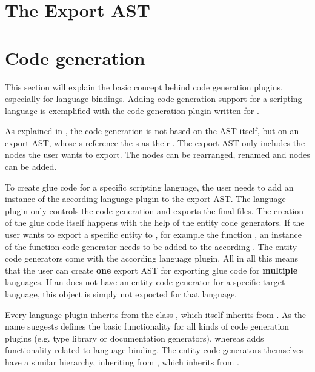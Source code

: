 \section{The Export AST}

\section{Code generation}

This section will explain the basic concept behind code generation plugins, especially for language bindings. Adding code generation support for a scripting language is exemplified with the code generation plugin written for .

As explained in , the code generation is not based on the  AST itself, but on an export AST, whose s reference the s as their . The export AST only includes the nodes the user wants to export. The nodes can be rearranged, renamed and  nodes can be added. 

To create glue code for a specific scripting language, the user needs to add an instance of the according language plugin to the export AST. The language plugin only controls the code generation and exports the final files. The creation of the glue code itself happens with the help of the entity code generators. If the user wants to export a specific  entity to , for example the function , an instance of the  function code generator needs to be added to the according . The entity code generators come with the according language plugin. All in all this means that the user can create \textbf{one} export AST for exporting glue code for \textbf{multiple} languages. If an  does not have an entity code generator for a specific target language, this object is simply not exported for that language.

Every language plugin inherits from the class , which itself inherits from . As the name suggests  defines the basic functionality for all kinds of code generation plugins (e.g. type library or documentation generators), whereas  adds functionality related to language binding. The entity code generators themselves have a similar hierarchy, inheriting from , which inherits from .

